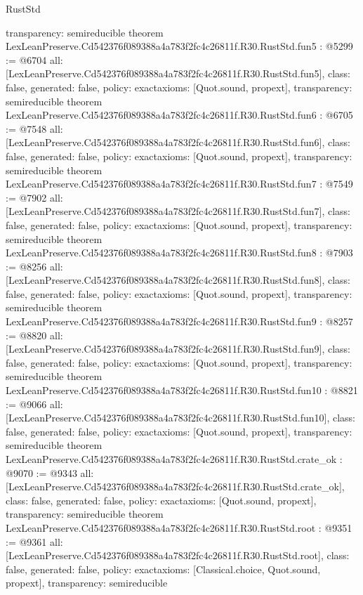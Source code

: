 \begin{lexlean}{RustStd}
\begin{coremodule}
{  transparency: semireducible
}
theorem LexLeanPreserve.Cd542376f089388a4a783f2fc4c26811f.R30.RustStd.fun5 : @5299 := @6704 {
  all: [LexLeanPreserve.Cd542376f089388a4a783f2fc4c26811f.R30.RustStd.fun5],
  class: false,
  generated: false,
  policy: exact{axioms: [Quot.sound, propext]},
  transparency: semireducible
}
theorem LexLeanPreserve.Cd542376f089388a4a783f2fc4c26811f.R30.RustStd.fun6 : @6705 := @7548 {
  all: [LexLeanPreserve.Cd542376f089388a4a783f2fc4c26811f.R30.RustStd.fun6],
  class: false,
  generated: false,
  policy: exact{axioms: [Quot.sound, propext]},
  transparency: semireducible
}
theorem LexLeanPreserve.Cd542376f089388a4a783f2fc4c26811f.R30.RustStd.fun7 : @7549 := @7902 {
  all: [LexLeanPreserve.Cd542376f089388a4a783f2fc4c26811f.R30.RustStd.fun7],
  class: false,
  generated: false,
  policy: exact{axioms: [Quot.sound, propext]},
  transparency: semireducible
}
theorem LexLeanPreserve.Cd542376f089388a4a783f2fc4c26811f.R30.RustStd.fun8 : @7903 := @8256 {
  all: [LexLeanPreserve.Cd542376f089388a4a783f2fc4c26811f.R30.RustStd.fun8],
  class: false,
  generated: false,
  policy: exact{axioms: [Quot.sound, propext]},
  transparency: semireducible
}
theorem LexLeanPreserve.Cd542376f089388a4a783f2fc4c26811f.R30.RustStd.fun9 : @8257 := @8820 {
  all: [LexLeanPreserve.Cd542376f089388a4a783f2fc4c26811f.R30.RustStd.fun9],
  class: false,
  generated: false,
  policy: exact{axioms: [Quot.sound, propext]},
  transparency: semireducible
}
theorem LexLeanPreserve.Cd542376f089388a4a783f2fc4c26811f.R30.RustStd.fun10 : @8821 := @9066 {
  all: [LexLeanPreserve.Cd542376f089388a4a783f2fc4c26811f.R30.RustStd.fun10],
  class: false,
  generated: false,
  policy: exact{axioms: [Quot.sound, propext]},
  transparency: semireducible
}
theorem LexLeanPreserve.Cd542376f089388a4a783f2fc4c26811f.R30.RustStd.crate_ok : @9070 := @9343 {
  all: [LexLeanPreserve.Cd542376f089388a4a783f2fc4c26811f.R30.RustStd.crate_ok],
  class: false,
  generated: false,
  policy: exact{axioms: [Quot.sound, propext]},
  transparency: semireducible
}
theorem LexLeanPreserve.Cd542376f089388a4a783f2fc4c26811f.R30.RustStd.root : @9351 := @9361 {
  all: [LexLeanPreserve.Cd542376f089388a4a783f2fc4c26811f.R30.RustStd.root],
  class: false,
  generated: false,
  policy: exact{axioms: [Classical.choice, Quot.sound, propext]},
  transparency: semireducible
}


\end{coremodule}
\end{lexlean}
